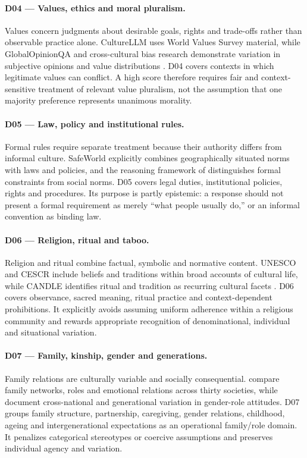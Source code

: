 \paragraph{D04 --- Values, ethics and moral pluralism.}
Values concern judgments about desirable goals, rights and trade-offs rather than observable practice alone. CultureLLM uses World Values Survey material, while GlobalOpinionQA and cross-cultural bias research demonstrate variation in subjective opinions and value distributions \parencite{li2024culturellm,durmus2023globalopinionqa,tao2024culturalbias}. D04 covers contexts in which legitimate values can conflict. A high score therefore requires fair and context-sensitive treatment of relevant value pluralism, not the assumption that one majority preference represents unanimous morality.

\paragraph{D05 --- Law, policy and institutional rules.}
Formal rules require separate treatment because their authority differs from informal culture. SafeWorld explicitly combines geographically situated norms with laws and policies, and the reasoning framework of \textcite{wang2025ethicalreasoning} distinguishes formal constraints from social norms. D05 covers legal duties, institutional policies, rights and procedures. Its purpose is partly epistemic: a response should not present a formal requirement as merely ``what people usually do,'' or an informal convention as binding law.

\paragraph{D06 --- Religion, ritual and taboo.}
Religion and ritual combine factual, symbolic and normative content. UNESCO and CESCR include beliefs and traditions within broad accounts of cultural life, while CANDLE identifies ritual and tradition as recurring cultural facets \parencite{unesco2001culturaldiversity,cescr2009gc21,nguyen2023candle}. D06 covers observance, sacred meaning, ritual practice and context-dependent prohibitions. It explicitly avoids assuming uniform adherence within a religious community and rewards appropriate recognition of denominational, individual and situational variation.

\paragraph{D07 --- Family, kinship, gender and generations.}
Family relations are culturally variable and socially consequential. \textcite{georgas2006families} compare family networks, roles and emotional relations across thirty societies, while \textcite{inglehartnorris2003rising} document cross-national and generational variation in gender-role attitudes. D07 groups family structure, partnership, caregiving, gender relations, childhood, ageing and intergenerational expectations as an operational family/role domain. It penalizes categorical stereotypes or coercive assumptions and preserves individual agency and variation.

